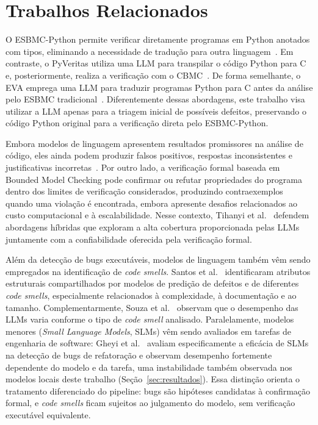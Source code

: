 \documentclass[sigconf]{acmart}
\begin{document}
\section{Trabalhos Relacionados}
 O ESBMC-Python permite verificar diretamente programas em Python anotados com tipos, eliminando a necessidade de tradução para outra linguagem~\cite{farias2024esbmcpython}. Em contraste, o PyVeritas utiliza uma LLM para transpilar o código Python para C e, posteriormente, realiza a verificação com o CBMC~\cite{orvalho2025pyveritas}. De forma semelhante, o EVA emprega uma LLM para traduzir programas Python para C antes da análise pelo ESBMC tradicional~\cite{shivaji2026eva}. Diferentemente dessas abordagens, este trabalho visa utilizar a LLM apenas para a triagem inicial de possíveis defeitos, preservando o código Python original para a verificação direta pelo ESBMC-Python.

Embora modelos de linguagem apresentem resultados promissores na análise
de código, eles ainda podem produzir falsos positivos, respostas
inconsistentes e justificativas incorretas~\cite{ullah2024secllmholmes,ding2025primevul}. Por outro lado, a verificação formal baseada em Bounded Model Checking pode confirmar ou refutar propriedades do programa dentro dos limites de verificação considerados, produzindo contraexemplos quando uma violação é encontrada, embora apresente desafios relacionados ao custo computacional e à escalabilidade. Nesse contexto, Tihanyi et al.~\cite{tihanyi2025vulnerability} defendem abordagens híbridas que exploram a alta cobertura proporcionada pelas LLMs juntamente com a confiabilidade oferecida pela verificação formal.

Além da detecção de bugs executáveis, modelos de linguagem também vêm sendo empregados na identificação de \textit{code smells}. Santos et al.~\cite{santos2023yetanothermodel} identificaram atributos estruturais compartilhados por modelos de predição de defeitos e de diferentes \textit{code smells}, especialmente relacionados à complexidade, à documentação e ao tamanho. Complementarmente, Souza et al.~\cite{souza2026beyondstrictrules} observam que o desempenho das LLMs varia conforme o tipo de \textit{code smell} analisado. Paralelamente, modelos menores (\textit{Small Language Models}, SLMs) vêm sendo avaliados em tarefas de engenharia de software: Gheyi et al.~\cite{gheyi2025slms} avaliam especificamente a eficácia de SLMs na detecção de bugs de refatoração e observam desempenho fortemente dependente do modelo e da tarefa, uma instabilidade também observada nos modelos locais deste trabalho (Seção~\ref{sec:resultados}). Essa distinção orienta o tratamento diferenciado do pipeline: bugs são hipóteses candidatas à confirmação formal, e \textit{code smells} ficam sujeitos ao julgamento do modelo, sem verificação executável equivalente.
\end{document}
